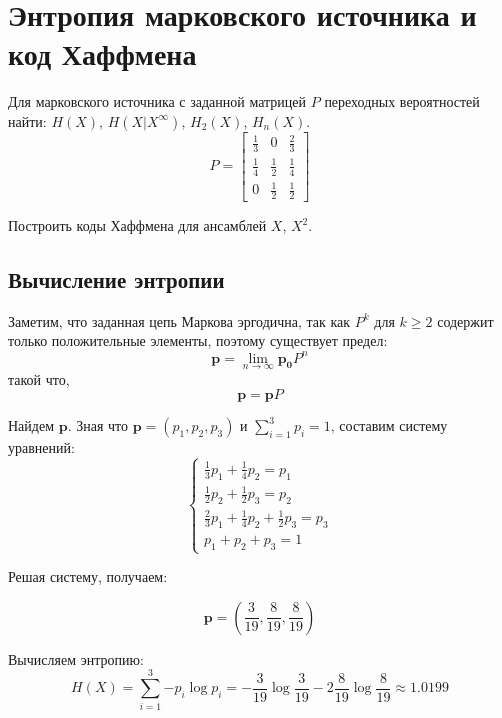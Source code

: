 \section{Энтропия марковского источника и код Хаффмена}
Для марковского источника с заданной матрицей $P$ переходных вероятностей найти: $H(X)$,
$H(X|X^{\infty})$,
$H_2(X)$,
$H_n(X)$.
\renewcommand{\arraystretch}{2.0}
\begin{equation}
P=
\left[\begin{array}{ccc}
\frac13 & 0 & \frac23 \\
\frac14 & \frac 12 & \frac14 \\
0 & \frac12 & \frac12
\end{array}\right]
\end{equation}

Построить коды Хаффмена для ансамблей $X$, $X^2$.

\subsection{Вычисление энтропии}
Заметим, что заданная цепь Маркова эргодична, так как $P^k$ для $k \ge 2$ содержит только положительные элементы, поэтому существует предел:
\begin{equation}
    \mathbf{p} = \lim\limits_{n \to \infty} \mathbf{p_0}P^n
\end{equation}
такой что,
\begin{equation}
    \mathbf{p} = \mathbf{p} P
\end{equation}

Найдем $\mathbf{p}$. Зная что $\mathbf{p} = (p_1, p_2, p_3)$ и $\sum\limits_{i=1}^3{p_i} = 1$, составим систему уравнений:
\begin{equation}
\left\{
\begin{aligned}
\frac13p_1+\frac14p_2=p_1 \\
\frac12p_2+\frac12p_3=p_2 \\
\frac23p_1+\frac14p_2+\frac12p_3=p_3 \\
p_1+p_2+p_3=1
\end{aligned}
\right.
\end{equation}

Решая систему, получаем:

\begin{equation}
    \mathbf{p} = \left(\frac3{19}, \frac8{19}, \frac8{19}\right)
\end{equation}

Вычисляем энтропию:
\begin{equation}
H(X)=\sum\limits_{i=1}^3{-p_i\log{p_i}}=-\frac{3}{19}\log\frac{3}{19}-2\frac{8}{19}\log\frac{8}{19}\approx 1.0199
\end{equation}

